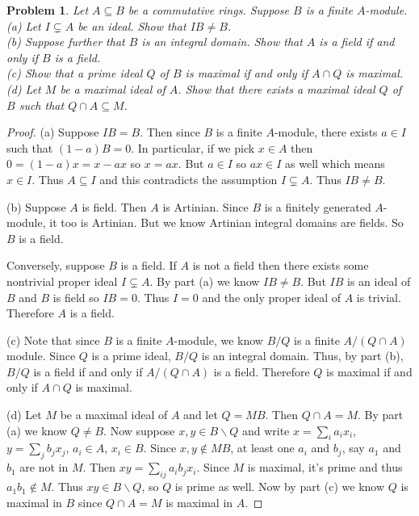 \documentclass{article}
\newtheorem{problem}{Problem}
\begin{document}
\begin{problem}
Let $A \subseteq B$ be a commutative rings. Suppose $B$ is a finite $A$-module.\\
(a) Let $I \subsetneq A$ be an ideal. Show that $IB \neq B$.\\
(b) Suppose further that $B$ is an integral domain. Show that $A$ is a field if and only if $B$ is a field.\\
(c) Show that a prime ideal $Q$ of $B$ is maximal if and only if $A \cap Q$ is maximal.\\
(d) Let $M$ be a maximal ideal of $A$. Show that there exists a maximal ideal $Q$ of $B$ such that $Q \cap A \subseteq M$.
\end{problem}
\begin{proof}
(a) Suppose $IB = B$. Then since $B$ is a finite $A$-module, there exists $a \in I$ such that $(1-a)B = 0$. In particular, if we pick $x \in A$ then $0 = (1-a)x = x - ax$ so $x = ax$. But $a \in I$ so $ax \in I$ as well which means $x \in I$. Thus $A \subseteq I$ and this contradicts the assumption $I \subsetneq A$. Thus $IB \neq B$.

(b) Suppose $A$ is field. Then $A$ is Artinian. Since $B$ is a finitely generated $A$-module, it too is Artinian. But we know Artinian integral domains are fields. So $B$ is a field.

Conversely, suppose $B$ is a field. If $A$ is not a field then there exists some nontrivial proper ideal $I \subsetneq A$. By part (a) we know $IB \neq B$. But $IB$ is an ideal of $B$ and $B$ is field so $IB = 0$. Thus $I = 0$ and the only proper ideal of $A$ is trivial. Therefore $A$ is a field.

(c) Note that since $B$ is a finite $A$-module, we know $B/Q$ is a finite $A/(Q \cap A)$ module. Since $Q$ is a prime ideal, $B/Q$ is an integral domain. Thus, by part (b), $B/Q$ is a field if and only if $A/(Q \cap A)$ is a field. Therefore $Q$ is maximal if and only if $A \cap Q$ is maximal.

(d) Let $M$ be a maximal ideal of $A$ and let $Q = MB$. Then $Q \cap A = M$. By part (a) we know $Q \neq B$. Now suppose $x,y \in B \backslash Q$ and write $x = \sum_i a_i x_i$, $y = \sum_j b_j x_j$, $a_i \in A$, $x_i \in B$. Since $x,y \notin MB$, at least one $a_i$ and $b_j$, say $a_1$ and $b_1$ are not in $M$. Then $xy = \sum_{ij} a_i b_j x_i$. Since $M$ is maximal, it's prime and thus $a_1b_1 \notin M$. Thus $xy \in B \backslash Q$, so $Q$ is prime as well. Now by part (c) we know $Q$ is maximal in $B$ since $Q \cap A = M$ is maximal in $A$.
\end{proof}
\end{document}
